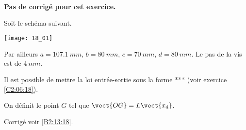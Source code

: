 \normalfalse \difficilefalse \tdifficiletrue
\correctionfalse


\setcounter{numques}{0}
\ifcorrection
\else
\textbf{Pas de corrigé pour cet exercice.}
\fi

\ifprof
\else

Soit le schéma suivant. 
\begin{center}
\texttt{[image: 18\_01]}
\end{center}
\fi

Par ailleurs $a=\SI{107,1}{mm}$, $b=\SI{80}{mm}$, $c=\SI{70}{mm}$, $d=\SI{80}{mm}$. Le pas de la vis est de $\SI{4}{mm}$.


Il est possible de mettre la loi entrée-sortie sous la forme *** (voir exercice \ref{C2:06:18}).

On définit le point $G$ tel que $\vect{OG}=L\vect{x_4}$.

\ifprof
\else
\fi

\ifprof
\else
\fi


\ifprof
\else
\begin{flushright}
\footnotesize{Corrigé  voir \ref{B2:13:18}.}
\end{flushright}%
\fi